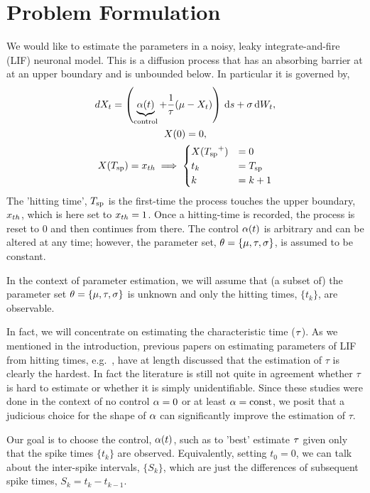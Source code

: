 \documentclass{article}
\begin{document}
\section{Problem Formulation}
\label{sec:problem_formulation}
We would like to estimate the parameters in a noisy, leaky integrate-and-fire
(LIF) neuronal model. This is a diffusion process that has an absorbing barrier
at at an upper boundary and is unbounded below. In particular it is governed by,
\begin{equation}
\begin{gathered}
dX_t = \left(\underbrace{\a(t)}_{\textrm{control}} + \frac 1\tc(\m %
 - {X_t} ) \right) \intd{s} + \s\intd{W_t},
\\
X(0) = 0,
\\
X(\ts) = \xth \implies  
\begin{cases}
X(\ts^+) &= 0   
\\
t_k &=  \ts
\\
k  &= k+1
\end{cases}
\end{gathered} 
\label{eq:X_evolution_uo}
\end{equation}
The 'hitting time', ${ T_{\textrm{sp} } }$ is the first-time the process touches the upper
boundary, ${ x_{th} }$, which is here set to ${ x_{th} }=1$. Once a hitting-time is
recorded, the process is reset to $0$ and then continues from there. The control
${\alpha}(t)$ is arbitrary and can be altered at any time; however, the parameter set,
${\theta} = \{{\mu }, { \tau }, {\sigma }\}$, is assumed to be constant.

In the context of parameter estimation, we will assume that (a subset of) the
parameter set ${\theta} = \{{\mu }, { \tau }, {\sigma }\}$ is unknown and only the hitting times,
$\{t_k\}$, are observable.

In fact, we will concentrate on estimating the characteristic time (${ \tau }$). As
we mentioned in the introduction, previous papers on estimating parameters of
LIF from hitting times, e.g.\ \cite{Ditlevsen2007,MullowneyIyengar2008}, have
at length discussed that the estimation of $\tau$ is clearly the
hardest. In fact the literature is still not quite in agreement whether $\tau$ is hard to estimate or
whether it is simply unidentifiable. Since these studies were done in the
context of no control ${\alpha}=0$ or at least ${\alpha}= \textrm{const}$, we posit that
a judicious choice for the shape of ${\alpha}$ can significantly improve the
estimation of $\tau$.

Our goal is to choose the control, ${\alpha}(t)$, such as to 'best' estimate ${ \tau }$
given only that the spike times $\{t_k\}$ are observed. Equivalently, setting
$t_0 = 0$, we can talk about the inter-spike intervals, $\{S_k\}$, which are
just the differences of subsequent spike times, $S_k = t_k - t_{k-1}$.
\end{document}
